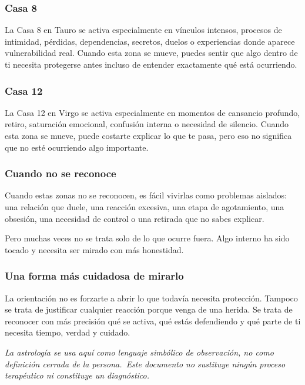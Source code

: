 \documentclass[11pt,a4paper]{article}
\begin{document}
\subsubsection*{Casa 8}
La Casa 8 en Tauro se activa especialmente en vínculos intensos, procesos de intimidad, pérdidas, dependencias, secretos, duelos o experiencias donde aparece vulnerabilidad real. Cuando esta zona se mueve, puedes sentir que algo dentro de ti necesita protegerse antes incluso de entender exactamente qué está ocurriendo.

\subsubsection*{Casa 12}
La Casa 12 en Virgo se activa especialmente en momentos de cansancio profundo, retiro, saturación emocional, confusión interna o necesidad de silencio. Cuando esta zona se mueve, puede costarte explicar lo que te pasa, pero eso no significa que no esté ocurriendo algo importante.

\subsubsection*{Cuando no se reconoce}
Cuando estas zonas no se reconocen, es fácil vivirlas como problemas aislados: una relación que duele, una reacción excesiva, una etapa de agotamiento, una obsesión, una necesidad de control o una retirada que no sabes explicar.

Pero muchas veces no se trata solo de lo que ocurre fuera. Algo interno ha sido tocado y necesita ser mirado con más honestidad.

\subsubsection*{Una forma más cuidadosa de mirarlo}
La orientación no es forzarte a abrir lo que todavía necesita protección. Tampoco se trata de justificar cualquier reacción porque venga de una herida. Se trata de reconocer con más precisión qué se activa, qué estás defendiendo y qué parte de ti necesita tiempo, verdad y cuidado.

\vspace{1cm}
\begin{center}
{\small\itshape\color{grisai}
La astrología se usa aquí como lenguaje simbólico de observación, no como definición cerrada de la persona.\
Este documento no sustituye ningún proceso terapéutico ni constituye un diagnóstico.
}
\end{center}
\end{document}
